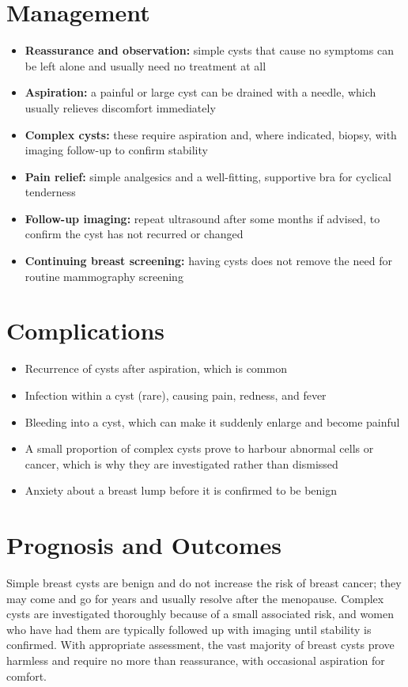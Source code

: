 \section*{Management}
\begin{itemize}
    \item \textbf{Reassurance and observation:} simple cysts that cause no symptoms can be left alone and usually need no treatment at all
    \item \textbf{Aspiration:} a painful or large cyst can be drained with a needle, which usually relieves discomfort immediately
    \item \textbf{Complex cysts:} these require aspiration and, where indicated, biopsy, with imaging follow-up to confirm stability
    \item \textbf{Pain relief:} simple analgesics and a well-fitting, supportive bra for cyclical tenderness
    \item \textbf{Follow-up imaging:} repeat ultrasound after some months if advised, to confirm the cyst has not recurred or changed
    \item \textbf{Continuing breast screening:} having cysts does not remove the need for routine mammography screening
\end{itemize}

\section*{Complications}
\begin{itemize}
    \item Recurrence of cysts after aspiration, which is common
    \item Infection within a cyst (rare), causing pain, redness, and fever
    \item Bleeding into a cyst, which can make it suddenly enlarge and become painful
    \item A small proportion of complex cysts prove to harbour abnormal cells or cancer, which is why they are investigated rather than dismissed
    \item Anxiety about a breast lump before it is confirmed to be benign
\end{itemize}

\section*{Prognosis and Outcomes}
Simple breast cysts are benign and do not increase the risk of breast cancer; they may come and go for years and usually resolve after the menopause. Complex cysts are investigated thoroughly because of a small associated risk, and women who have had them are typically followed up with imaging until stability is confirmed. With appropriate assessment, the vast majority of breast cysts prove harmless and require no more than reassurance, with occasional aspiration for comfort.

